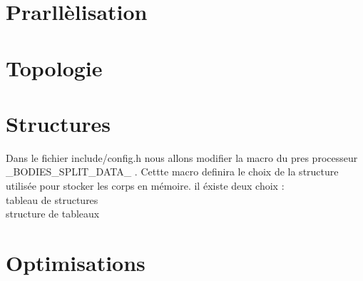 \section{Prarllèlisation}

\section{Topologie}


\section{Structures}
Dans le fichier include/config.h nous allons modifier la macro du pres processeur \_BODIES\_SPLIT\_DATA\_ .
Cettte macro definira le choix de la structure utilisée pour stocker les corps en mémoire.
il éxiste deux choix : \\
tableau de structures\\
structure de tableaux\\

\section{Optimisations}



